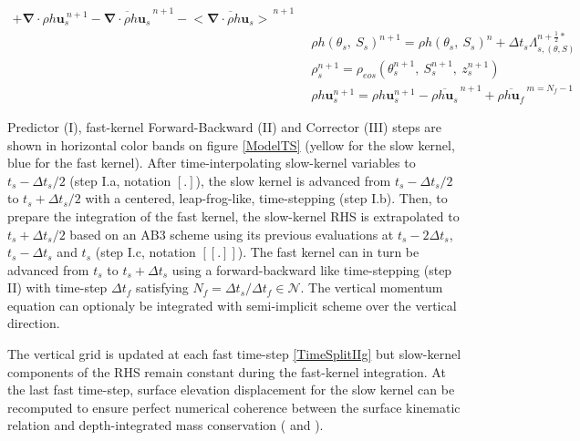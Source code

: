 \begin{table}
\begin{subequations}
\begin{alignat}{3}
 +\mathbf{\nabla}\cdot\rho h \mathbf{u}_s^{\ n+1}
 -\overline{\mathbf{\nabla}\cdot\rho h \mathbf{u}_s}^{\ n+1}
 -\overline{<\mathbf{\nabla}\cdot\rho h \mathbf{u}_s>}^{\ n+1}\\[2mm]
 \label{TimeSplitIIIb3}
 &\enspace\rho h(\theta_s,\ S_s)^{n+1}=
 \rho h(\theta_s,\ S_s)^{n}
 +\Delta t_s\Lambda_{s,(\theta,S)}^{n+\frac{1}{2}*}\\[0mm]
 \label{TimeSplitIIIb4}
 &\enspace\rho_s^{n+1}=\rho_{eos}\left(\theta_s^{n+1},\ S_s^{n+1},\ z_s^{n+1}\right)\\[0mm]
 \label{TimeSplitIIIb5}
 &\enspace\rho h\mathbf{u}_s^{n+1}=\rho h\mathbf{u}_s^{n+1}
 -\overline{\rho h\mathbf{u}_s}^{\ n+1}
 +\overline{\rho h\mathbf{u}_f}^{\ m=N_f-1}
\end{alignat}
\end{subequations}
\end{table}
Predictor (I), fast-kernel Forward-Backward (II) and Corrector (III) steps are shown in horizontal color bands on figure \ref{ModelTS} (yellow for the slow kernel, blue for the fast kernel). After time-interpolating slow-kernel variables to $t_s-\Delta t_s/2$ (step I.a, notation $[.]$), the slow kernel is advanced from $t_s-\Delta t_s/2$ to $t_s+\Delta t_s/2$ with a centered, leap-frog-like, time-stepping (step I.b). Then, to prepare the integration of the fast kernel, the slow-kernel RHS is extrapolated to $t_s+\Delta t_s/2$ based on an AB3 scheme using its previous evaluations at $t_s-2\Delta t_s$, $t_s-\Delta t_s$ and $t_s$ (step I.c, notation $[[.]]$). The fast kernel can in turn be advanced from $t_s$ to $t_s+\Delta t_s$ using a forward-backward like time-stepping (step II) with time-step $\Delta t_f$ satisfying  $N_f=\Delta t_s/\Delta t_f\in\mathcal{N}$. The vertical momentum equation can optionaly be integrated with semi-implicit scheme over the vertical direction.

The vertical grid is updated at each fast time-step \ref{TimeSplitIIg} but slow-kernel components of the RHS remain constant during the fast-kernel integration. At the last fast time-step, surface elevation displacement for the slow kernel can be recomputed to ensure perfect numerical coherence between the surface kinematic relation and depth-integrated mass conservation ( and ).

